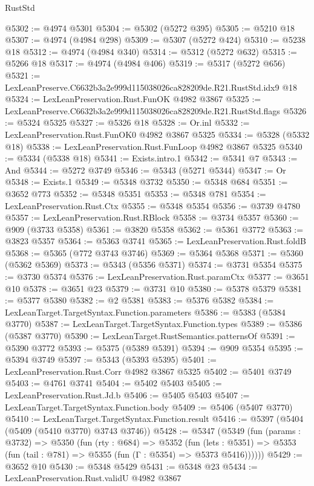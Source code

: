 \begin{lexlean}{RustStd}
\begin{coremodule}
@5302 := @4974 @5301
@5304 := @5302 (@5272 @395)
@5305 := @5210 @18
@5307 := @4974 (@4984 @298)
@5309 := @5307 (@5272 @424)
@5310 := @5238 @18
@5312 := @4974 (@4984 @340)
@5314 := @5312 (@5272 @632)
@5315 := @5266 @18
@5317 := @4974 (@4984 @406)
@5319 := @5317 (@5272 @656)
@5321 := LexLeanPreserve.C6632b3a2e999d115038026ca828209de.R21.RustStd.idx9 @18
@5324 := LexLeanPreservation.Rust.FunOK @4982 @3867
@5325 := LexLeanPreserve.C6632b3a2e999d115038026ca828209de.R21.RustStd.flags
@5326 := @5324 @5325
@5327 := @5326 @18
@5328 := Or.inl
@5332 := LexLeanPreservation.Rust.FunOK0 @4982 @3867 @5325
@5334 := @5328 (@5332 @18)
@5338 := LexLeanPreservation.Rust.FunLoop @4982 @3867 @5325
@5340 := @5334 (@5338 @18)
@5341 := Exists.intro.{1}
@5342 := @5341 @7
@5343 := And
@5344 := @5272 @3749
@5346 := @5343 (@5271 @5344)
@5347 := Or
@5348 := Exists.{1}
@5349 := @5348 @3732
@5350 := @5348 @684
@5351 := @3652 @773
@5352 := @5348 @5351
@5353 := @5348 @781
@5354 := LexLeanPreservation.Rust.Ctx
@5355 := @5348 @5354
@5356 := @3739 @4780
@5357 := LexLeanPreservation.Rust.RBlock
@5358 := @3734 @5357
@5360 := @909 (@3733 @5358)
@5361 := @3820 @5358
@5362 := @5361 @3772
@5363 := @3823 @5357
@5364 := @5363 @3741
@5365 := LexLeanPreservation.Rust.foldB
@5368 := @5365 (@772 @3743 @3746)
@5369 := @5364 @5368
@5371 := @5360 (@5362 @5369)
@5373 := @5343 (@5356 @5371)
@5374 := @3731 @5354
@5375 := @3730 @5374
@5376 := LexLeanPreservation.Rust.paramCtx
@5377 := @3651 @10
@5378 := @3651 @23
@5379 := @3731 @10
@5380 := @5378 @5379
@5381 := @5377 @5380
@5382 := @2 @5381
@5383 := @5376 @5382
@5384 := LexLeanTarget.TargetSyntax.Function.parameters
@5386 := @5383 (@5384 @3770)
@5387 := LexLeanTarget.TargetSyntax.Function.types
@5389 := @5386 (@5387 @3770)
@5390 := LexLeanTarget.RustSemantics.patternsOf
@5391 := @5390 @3772
@5393 := @5375 (@5389 @5391)
@5394 := @909 @5354
@5395 := @5394 @3749
@5397 := @5343 (@5393 @5395)
@5401 := LexLeanPreservation.Rust.Corr @4982 @3867 @5325
@5402 := @5401 @3749
@5403 := @4761 @3741
@5404 := @5402 @5403
@5405 := LexLeanPreservation.Rust.Jd.b
@5406 := @5405 @5403
@5407 := LexLeanTarget.TargetSyntax.Function.body
@5409 := @5406 (@5407 @3770)
@5410 := LexLeanTarget.TargetSyntax.Function.result
@5416 := @5397 (@5404 (@5409 (@5410 @3770) @3743 @3746))
@5428 := @5347
    (@5349
      (fun (params : @3732) =>
      @5350
        (fun (rty : @684) =>
        @5352
          (fun (lets : @5351) =>
          @5353 (fun (tail : @781) => @5355 (fun (Γ : @5354) => @5373 @5416))))))
@5429 := @3652 @10
@5430 := @5348 @5429
@5431 := @5348 @23
@5434 := LexLeanPreservation.Rust.validU @4982 @3867

\end{coremodule}
\end{lexlean}
